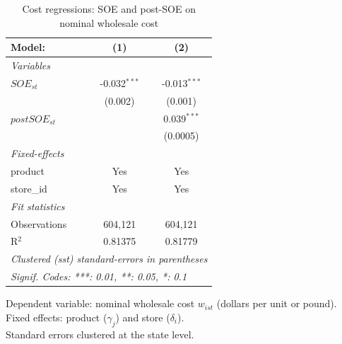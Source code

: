
\begin{table}[htbp]
   \caption{\label{tab:cost_reg} Cost regressions: SOE and post-SOE on nominal wholesale cost}
   \centering
   \begin{tabular}{lcc}
      \tabularnewline \midrule \midrule
      Model:         & (1)            & (2)\\  
      \midrule
      \emph{Variables}\\
      $SOE_{st}$     & -0.032$^{***}$ & -0.013$^{***}$\\   
                     & (0.002)        & (0.001)\\   
      $postSOE_{st}$ &                & 0.039$^{***}$\\   
                     &                & (0.0005)\\   
      \midrule
      \emph{Fixed-effects}\\
      product        & Yes            & Yes\\  
      store\_id      & Yes            & Yes\\  
      \midrule
      \emph{Fit statistics}\\
      Observations   & 604,121        & 604,121\\  
      R$^2$          & 0.81375        & 0.81779\\  
      \midrule \midrule
      \multicolumn{3}{l}{\emph{Clustered (sst) standard-errors in parentheses}}\\
      \multicolumn{3}{l}{\emph{Signif. Codes: ***: 0.01, **: 0.05, *: 0.1}}\\
   \end{tabular}
   
   \par \raggedright 
   Dependent variable: nominal wholesale cost $w_{ist}$ (dollars per unit or pound).\\
   Fixed effects: product ($\gamma_j$) and store ($\delta_i$).\\
   Standard errors clustered at the state level.
\end{table}



